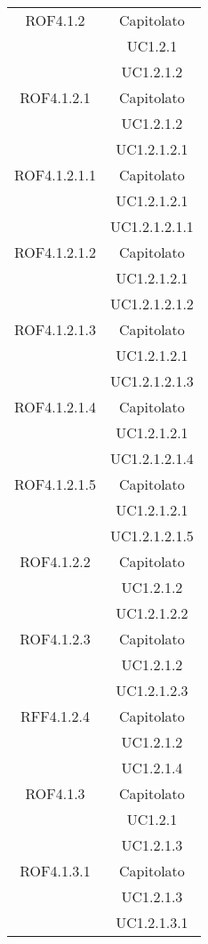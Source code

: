 \begin{longtable}{|c|c|}
\midrule
ROF4.1.2
& Capitolato\\
& UC1.2.1\\
& UC1.2.1.2\\

\midrule
ROF4.1.2.1
& Capitolato\\
& UC1.2.1.2\\
& UC1.2.1.2.1\\

\midrule
ROF4.1.2.1.1
& Capitolato\\
& UC1.2.1.2.1\\
& UC1.2.1.2.1.1\\

\midrule
ROF4.1.2.1.2
& Capitolato\\
& UC1.2.1.2.1\\
& UC1.2.1.2.1.2\\

\midrule
ROF4.1.2.1.3
& Capitolato\\
& UC1.2.1.2.1\\
& UC1.2.1.2.1.3\\

\midrule
ROF4.1.2.1.4
& Capitolato\\
& UC1.2.1.2.1\\
& UC1.2.1.2.1.4\\

\midrule
ROF4.1.2.1.5
& Capitolato\\
& UC1.2.1.2.1\\
& UC1.2.1.2.1.5\\

\midrule
ROF4.1.2.2
& Capitolato\\
& UC1.2.1.2\\
& UC1.2.1.2.2\\

\midrule
ROF4.1.2.3
& Capitolato\\
& UC1.2.1.2\\
& UC1.2.1.2.3\\

\midrule
RFF4.1.2.4
& Capitolato\\
& UC1.2.1.2\\
& UC1.2.1.4\\

\midrule
ROF4.1.3
& Capitolato\\
& UC1.2.1\\
& UC1.2.1.3\\

\midrule
ROF4.1.3.1
& Capitolato\\
& UC1.2.1.3\\
& UC1.2.1.3.1\\


\end{longtable}
